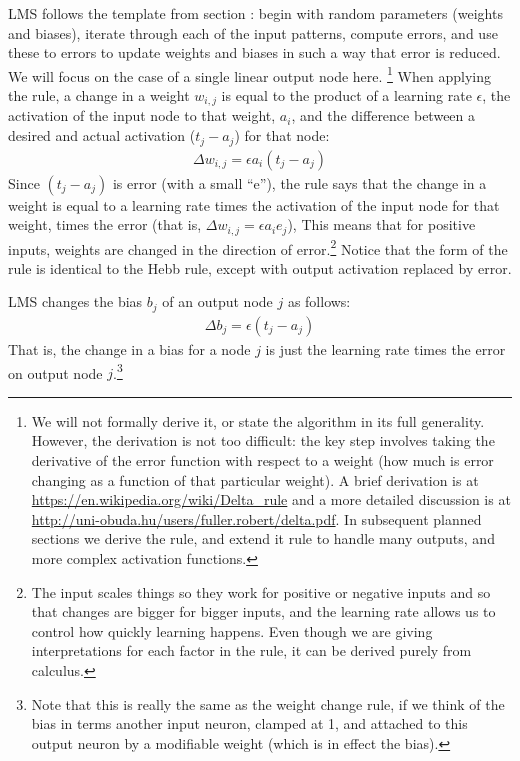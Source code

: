 LMS follows the template from section : begin with random parameters (weights and biases), iterate through each of the input patterns, compute errors, and use these to errors to update weights and biases in such a way that error is reduced. We will focus on the case of a single linear output node here. \footnote{We will not formally derive it, or state the algorithm in its full generality. However, the derivation is not too difficult: the key step involves taking the derivative of the error function with respect to a weight (how much is error changing as a function of that particular weight). A brief derivation is at \url{https://en.wikipedia.org/wiki/Delta_rule} and a more detailed discussion is at \url{http://uni-obuda.hu/users/fuller.robert/delta.pdf}. In subsequent planned sections we derive the rule, and extend it rule to handle many outputs, and more complex activation functions.} When applying the rule, a change in a weight $w_{i,j}$ is equal to the product of a learning rate $\epsilon$, the activation of the input node to that weight, $a_i$, and the difference between a desired and actual activation ($t_j - a_j$) for that node:
\begin{eqnarray*}
\Delta w_{i,j}  =  \epsilon a_i (t_j - a_j)
\end{eqnarray*}
Since $(t_j - a_j)$ is error  (with a small ``e''), the rule says that the change in a weight is equal to a learning rate times the activation of the input node for that weight, times the error (that is, $\Delta w_{i,j}  =  \epsilon a_i e_j$),  This means that for positive inputs, weights are changed in the direction of error.\footnote{The input scales things so they work for positive or negative inputs and so that changes are bigger for bigger inputs, and the learning rate allows us to control how quickly learning happens. Even though we are giving interpretations for each factor in the rule, it can be derived purely from calculus.} Notice that the form of the rule is identical to the Hebb rule, except with output activation replaced by error. 

LMS changes the bias $b_j$ of an output node $j$ as follows: 
\begin{eqnarray*}
\Delta b_j  =  \epsilon (t_j - a_j)
\end{eqnarray*}
That is, the change in a bias for a node $j$ is just the learning rate times the error on output node $j$.\footnote{Note that this is really the same as the weight change rule, if we think of the bias in terms another input neuron, clamped at 1, and attached to this output neuron by a modifiable weight (which is in effect the bias).}


